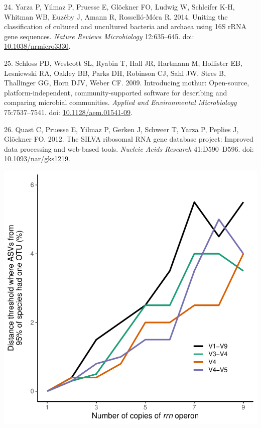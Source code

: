 \documentclass[
]{article}
\newenvironment{cslreferences}%
  {}%
  {\par}
\begin{document}
\begin{cslreferences}
\leavevmode\hypertarget{ref-Yarza2014}{}%
24. Yarza P, Yilmaz P, Pruesse E, Glöckner FO, Ludwig W, Schleifer K-H,
Whitman WB, Euzéby J, Amann R, Rosselló-Móra R. 2014. Uniting the
classification of cultured and uncultured bacteria and archaea using 16S
rRNA gene sequences. \emph{Nature Reviews Microbiology} 12:635--645.
doi: \href{https://doi.org/10.1038/nrmicro3330}{10.1038/nrmicro3330}.

\leavevmode\hypertarget{ref-Schloss2009}{}%
25. Schloss PD, Westcott SL, Ryabin T, Hall JR, Hartmann M, Hollister
EB, Lesniewski RA, Oakley BB, Parks DH, Robinson CJ, Sahl JW, Stres B,
Thallinger GG, Horn DJV, Weber CF. 2009. Introducing mothur:
Open-source, platform-independent, community-supported software for
describing and comparing microbial communities. \emph{Applied and
Environmental Microbiology} 75:7537--7541. doi:
\href{https://doi.org/10.1128/aem.01541-09}{10.1128/aem.01541-09}.

\leavevmode\hypertarget{ref-Quast2012}{}%
26. Quast C, Pruesse E, Yilmaz P, Gerken J, Schweer T, Yarza P, Peplies
J, Glöckner FO. 2012. The SILVA ribosomal RNA gene database project:
Improved data processing and web-based tools. \emph{Nucleic Acids
Research} 41:D590--D596. doi:
\href{https://doi.org/10.1093/nar/gks1219}{10.1093/nar/gks1219}.
\end{cslreferences}

\setlength{\parindent}{0in}
\setlength{\leftskip}{0in}

\newpage

\includegraphics{../figures/copy_number_threshold_plot.pdf}
\end{document}
